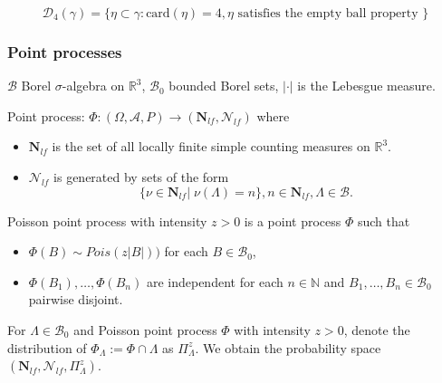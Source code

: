 \documentclass[c, 10pt]{beamer}
\begin{document}
\begin{frame}
\begin{center}
\end{center}


$$\mathcal D_4(\gamma) = \{ \eta \subset \gamma: \mathrm{card}(\eta)=4, \eta \text{ satisfies the empty ball property } \}$$




\end{frame}



\begin{frame}\frametitle{Point processes}

	$\mathcal B$ Borel $\sigma$-algebra on $\mathbb R^3$, $\mathcal B_0$ bounded Borel sets, $|\cdot|$ is the Lebesgue measure. \noindent

	\alert{Point process}: $\Phi: (\Omega, \mathcal A, P) \to (\mathbf N_{lf}, \mathcal N_{lf})$ where 
\begin{itemize}
	\item $\mathbf N_{lf}$ is the set of all locally finite simple counting measures on $\mathbb R^3$.
	\item $\mathcal N_{lf}$ is generated by sets of the form $$\{\nu \in \mathbf N_{lf} | \; \nu(\Lambda) = n \}, n \in \mathbf N_{lf}, \Lambda \in \mathcal B.$$
\end{itemize}


\alert{Poisson point process} with intensity $z>0$ is a point process $\Phi$ such that
\begin{itemize}
    \item $\Phi(B) \sim Pois(z|B|))$ for each $B \in \mathcal B_0$,
    \item $\Phi(B_1), \dots, \Phi(B_n)$ are independent for each $n \in \mathbb N$ and $B_1,\dots, B_n \in \mathcal B_0$ pairwise disjoint.
\end{itemize}

\vspace{5mm} 
For $\Lambda \in \mathcal B_0$ and Poisson point process $\Phi$ with intensity $z>0$, denote the distribution of $\Phi_\Lambda := \Phi \cap \Lambda$ as \alert{$\Pi_\Lambda^z$}. \newline
We obtain the probability space $(\mathbf N_{lf}, \mathcal N_{lf}, \Pi^z_\Lambda)$.


\end{frame}
\end{document}
